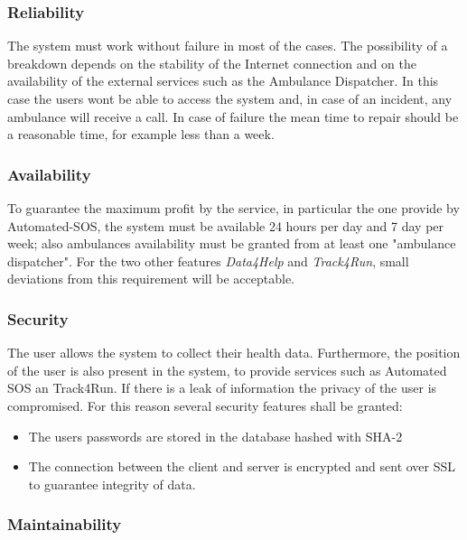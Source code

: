 \documentclass[a4paper]{article}
\begin{document}
        \subsubsection{Reliability}
        The system must work without failure in most of the cases. The possibility of a breakdown depends on the stability of the Internet connection and on the availability of the external services such as the Ambulance Dispatcher. In this case the users wont be able to access the system and, in case of an incident, any ambulance will receive a call. In case of failure the mean time to repair should be a reasonable time, for example less than a week.
       
        \subsubsection{Availability}
        To guarantee the maximum profit by the service, in particular the one provide by Automated-SOS, the system must be available 24 hours per day and 7 day per week; also ambulances availability must be granted from at least one "ambulance dispatcher". For the two other features \textit{Data4Help} and \textit{Track4Run}, small deviations from this requirement will be acceptable.
        
        \subsubsection{Security}
        The user allows the system to collect their health data. Furthermore, the position of the user is also present in the system, to provide services such as Automated SOS an Track4Run. If there is a leak of information the privacy of the user is compromised. For this reason several security features shall be granted:
       
        \begin{itemize}
        \item         The users passwords are stored in the database hashed with SHA-2\item       The  connection between the client and server is encrypted and sent over SSL to guarantee integrity of data. 
        \end{itemize}
        
        \subsubsection{Maintainability}
\end{document}
